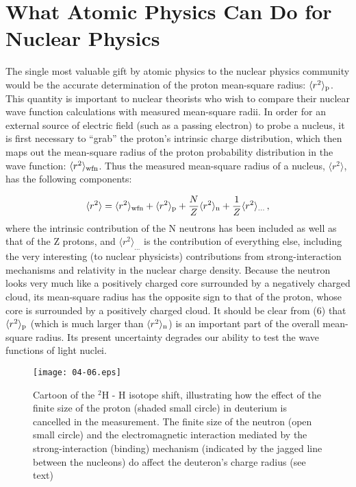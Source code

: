 \documentclass{svmult}
\begin{document}
\section{What Atomic Physics Can Do for Nuclear Physics}

The single most valuable gift by atomic physics to the nuclear physics community
would be the accurate determination of the proton mean-square radius: $\langle
r^2 \rangle_{\rm p}$.  This quantity is important to nuclear theorists who wish
to compare their nuclear wave function calculations with measured mean-square
radii.  In order for an external source of electric field (such as a passing
electron) to probe a nucleus, it is first necessary to ``grab'' the proton's
intrinsic charge distribution, which then maps out
the mean-square radius of the proton probability
distribution in the wave function: $\langle
r^2 \rangle_{\rm wfn}$. Thus the measured mean-square radius of a nucleus,
$\langle r^2 \rangle$, has the following components:

\begin{equation}
\langle r^2 \rangle = \langle r^2 \rangle_{\rm wfn} + \langle r^2 \rangle_{\rm 
p}+ \frac{N}{Z} \langle r^2 \rangle_{\rm n} + \frac{1}{Z} \langle r^2 
\rangle_{\ldots} \, ,
\end{equation}
where the intrinsic contribution of the N neutrons has been included as well as
that of the Z protons, and $\langle r^2 \rangle_{\ldots}$ is the contribution of
everything else, including the very interesting (to nuclear physicists)
contributions from strong-interaction mechanisms and relativity in the nuclear
charge density\cite{czech}.
Because the neutron looks very much like a positively charged core surrounded by
a negatively charged cloud, its mean-square radius
has the opposite sign to that of the proton, whose core is surrounded by a
positively charged cloud. It should be clear from (6) that $\langle r^2
\rangle_{\rm p}$ (which is much larger than $\langle r^2 \rangle_{\rm n}$) is an
important part of the overall mean-square radius. Its present uncertainty
degrades our ability to test the wave functions of light nuclei.

\begin{figure}
  \centering
  \texttt{[image: 04-06.eps]}
  \caption{Cartoon of the $^2$H - H isotope shift, illustrating how the effect 
  of the finite size of the proton (shaded small circle) in deuterium is 
  cancelled in the measurement. The finite size of the neutron (open small 
  circle) and the electromagnetic interaction mediated by the strong-interaction
  (binding) mechanism (indicated by the jagged line between the nucleons) do 
  affect the deuteron's charge radius (see text)}
\end{figure}
\end{document}

